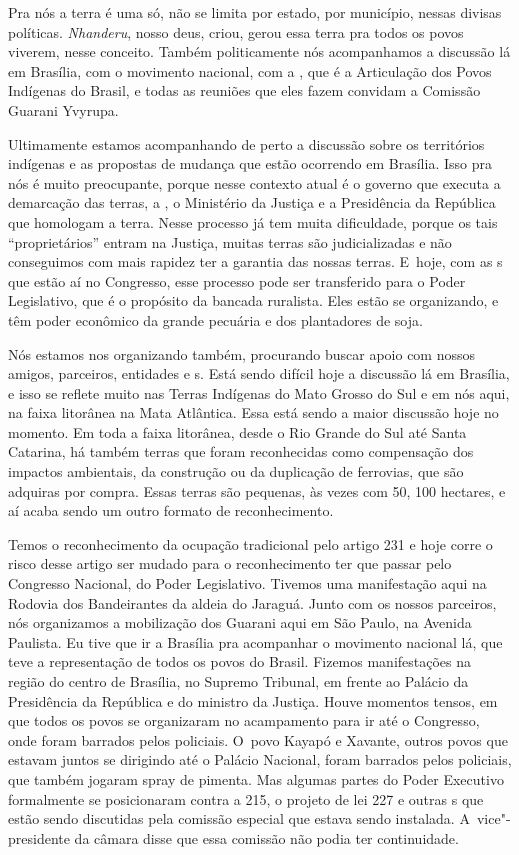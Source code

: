 Pra nós a terra é uma só, não se limita por estado, por município,
nessas divisas políticas. \emph{Nhanderu}, nosso deus, criou, gerou essa terra
pra todos os povos viverem, nesse conceito. Também politicamente nós
acompanhamos a discussão lá em Brasília, com o movimento nacional, com
a , que é a Articulação dos Povos Indígenas do Brasil, e todas as
reuniões que eles fazem convidam a Comissão Guarani Yvyrupa.

Ultimamente estamos acompanhando de perto a discussão sobre os
territórios indígenas e as propostas de mudança que estão ocorrendo em
Brasília. Isso pra nós é muito preocupante, porque nesse contexto atual
é o governo que executa a demarcação das terras, a , o Ministério
da Justiça e a Presidência da República que homologam a terra. Nesse
processo já tem muita dificuldade, porque os tais ``proprietários''
entram na Justiça, muitas terras são judicializadas e não conseguimos
com mais rapidez ter a garantia das nossas terras. E~hoje, com as s
que estão aí no Congresso, esse processo pode ser transferido para o
Poder Legislativo, que é o propósito da bancada ruralista. Eles estão
se organizando, e têm poder econômico da grande pecuária e dos
plantadores de soja. 

Nós estamos nos organizando também, procurando buscar apoio com nossos
amigos, parceiros, entidades e s. Está sendo difícil hoje a
discussão lá em Brasília, e isso se reflete muito nas Terras Indígenas
do Mato Grosso do Sul e em nós aqui, na faixa litorânea na Mata Atlântica.
Essa está sendo a maior discussão hoje no momento. Em toda a faixa
litorânea, desde o Rio Grande do Sul até Santa Catarina, há também
terras que foram reconhecidas como compensação dos impactos ambientais,
da construção ou da duplicação de ferrovias, que são adquiras por
compra. Essas terras são pequenas, às vezes com 50, 100 hectares, e aí
acaba sendo um outro formato de reconhecimento.

Temos o reconhecimento da ocupação tradicional pelo artigo 231 e hoje
corre o risco desse artigo ser mudado para o reconhecimento ter que
passar pelo Congresso Nacional, do Poder Legislativo. Tivemos uma
manifestação aqui na Rodovia dos Bandeirantes da aldeia do Jaraguá.
Junto com os nossos parceiros, nós organizamos a mobilização dos
Guarani aqui em São Paulo, na Avenida Paulista. Eu tive que ir a
Brasília pra acompanhar o movimento nacional lá, que teve a
representação de todos os povos do Brasil. Fizemos manifestações na
região do centro de Brasília, no Supremo Tribunal, em frente ao Palácio
da Presidência da República e do ministro da Justiça. Houve momentos
tensos, em que todos os povos se organizaram no acampamento para ir até
o Congresso, onde foram barrados pelos policiais. O~povo Kayapó e
Xavante, outros povos que estavam juntos se dirigindo até o Palácio
Nacional, foram barrados pelos policiais, que também jogaram spray de
pimenta. Mas algumas partes do Poder Executivo formalmente se
posicionaram contra a  215, o projeto de lei 227 e outras s que
estão sendo discutidas pela comissão especial que estava sendo
instalada. A~vice"-presidente da câmara disse que essa comissão não
podia ter continuidade.

